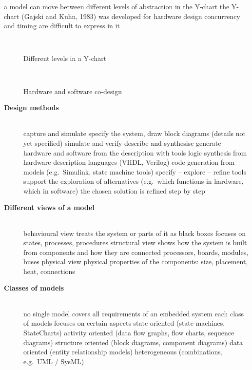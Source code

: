 \bi
	\ite a model can move between different levels of abstraction in the Y-chart
	\ite the Y-chart (Gajski and Kuhn, 1983) was developed for hardware design
	\ite concurrency and timing are difficult to express in it
\ei

\begin{figure}[!hbtp]
     \begin{center}
	  \\
	  \caption{Different levels in a Y-chart}
     \end{center}
\end{figure}
\os{\newpage}

\begin{figure}[!hbtp]
     \begin{center}
	  \\
	  \caption{Hardware and software co-design}
     \end{center}
\end{figure}
\os{\newpage}

\begin{description}
\item[{\rot\bf Design methods}]~\\[-\lblskip]
\bi
	\ite capture and simulate
	\bi
		\ite specify the system, draw block diagrams (details not yet specified)
		\ite simulate and verify
	\ei
	\ite describe and synthesise
	\bi
		\ite generate hardware and software from the description with tools
		\ite logic synthesis from hardware description languages (VHDL, Verilog)
		\ite code generation from models (e.g.\ Simulink, state machine tools)
	\ei
	\ite specify -- explore -- refine
	\bi
		\ite tools support the exploration of alternatives (e.g.\ which functions in hardware, which in software)
		\ite the chosen solution is refined step by step
	\ei
\ei
\end{description}
\os{\newpage}

\begin{description}
\item[{\rot\bf Different views of a model}]~\\[-\lblskip]
\bi
	\ite behavioural view
	\bi
		\ite treats the system or parts of it as black boxes
		\ite focuses on states, processes, procedures
	\ei
	\ite structural view
	\bi
		\ite shows how the system is built from components and how they are connected
		\ite processors, boards, modules, buses
	\ei
	\ite physical view
	\bi
		\ite physical properties of the components: size, placement, heat, connections
	\ei
\ei
\item[{\rot\bf Classes of models}]~\\[-\lblskip]
\bi
	\ite no single model covers all requirements of an embedded system
	\ite each class of models focuses on certain aspects
	\bi
		\ite state oriented (state machines, StateCharts)
		\ite activity oriented (data flow graphs, flow charts, sequence diagrams)
		\ite structure oriented (block diagrams, component diagrams)
		\ite data oriented (entity relationship models)
		\ite heterogeneous (combinations, e.g.\ UML / SysML)
	\ei
\ei
\end{description}
\os{\newpage}


